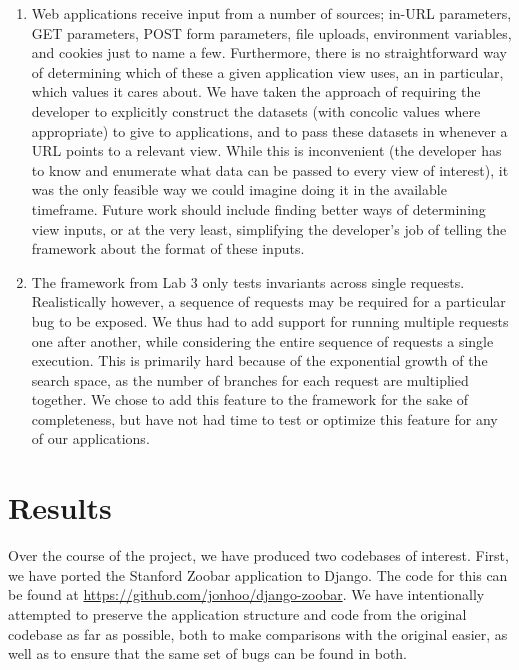 \documentclass{scrartcl}
\begin{document}
\begin{enumerate}
	\item Web applications receive input from a number of sources; in-URL
		parameters, GET parameters, POST form parameters, file uploads,
		environment variables, and cookies just to name a few.
		Furthermore, there is no straightforward way of determining
		which of these a given application view uses, an in particular,
		which values it cares about. We have taken the approach of
		requiring the developer to explicitly construct the datasets
		(with concolic values where appropriate) to give to
		applications, and to pass these datasets in whenever a URL
		points to a relevant view. While this is inconvenient (the
		developer has to know and enumerate what data can be passed to
		every view of interest), it was the only feasible way we could
		imagine doing it in the available timeframe. Future work should
		include finding better ways of determining view inputs, or at
		the very least, simplifying the developer's job of telling the
		framework about the format of these inputs.
	
	\item The framework from Lab 3 only tests invariants across single
		requests. Realistically however, a sequence of requests may be
		required for a particular bug to be exposed. We thus had to add
		support for running multiple requests one after another, while
		considering the entire sequence of requests a single execution.
		This is primarily hard because of the exponential growth of the
		search space, as the number of branches for each request are
		multiplied together. We chose to add this feature to the
		framework for the sake of completeness, but have not had time
		to test or optimize this feature for any of our applications.
\end{enumerate}

\section{Results}
Over the course of the project, we have produced two codebases of interest.
First, we have ported the Stanford Zoobar application to Django. The code for
this can be found at \url{https://github.com/jonhoo/django-zoobar}. We have
intentionally attempted to preserve the application structure and code from the
original codebase as far as possible, both to make comparisons with the
original easier, as well as to ensure that the same set of bugs can be found in
both.
\end{document}
